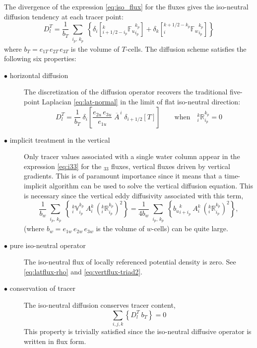 \documentclass[../main/NEMO_manual]{subfiles}
\begin{document}
The divergence of the expression \autoref{eq:iso_flux} for the fluxes gives the iso-neutral diffusion tendency at
each tracer point:
\[
  D_l^T = \frac{1}{b_T}
  \sum_{\substack{i_p,\,k_p}} \left\{ \delta_{i} \left[{_{i+1/2-i_p}^k
        {\mathbb{F}_u }_{i_p}^{k_p}} \right] + \delta_{k} \left[
      {_i^{k+1/2-k_p} {\mathbb{F}_w}_{i_p}^{k_p}} \right] \right\}
\]
where $b_T= e_{1T}\,e_{2T}\,e_{3T}$ is the volume of $T$-cells.
The diffusion scheme satisfies the following six properties:
\begin{description}
\item[$\bullet$ horizontal diffusion]
  The discretization of the diffusion operator recovers the traditional five-point Laplacian
  \autoref{eq:lat-normal} in the limit of flat iso-neutral direction:
  \[
    D_l^T = \frac{1}{b_T} \
    \delta_{i} \left[ \frac{e_{2u}\,e_{3u}}{e_{1u}} \;
      \overline{A}^{\,i} \; \delta_{i+1/2}[T] \right] \qquad
    \text{when} \quad { _i^k \mathbb{R}_{i_p}^{k_p} }=0
  \]

\item[$\bullet$ implicit treatment in the vertical]
  Only tracer values associated with a single water column appear in the expression \autoref{eq:i33} for
  the $_{33}$ fluxes, vertical fluxes driven by vertical gradients.
  This is of paramount importance since it means that a time-implicit algorithm can be used to
  solve the vertical diffusion equation.
  This is necessary since the vertical eddy diffusivity associated with this term,
  \[
    \frac{1}{b_w}\sum_{\substack{i_p, \,k_p}} \left\{
      {\:}_i^k\mathbb{V}_{i_p}^{k_p} \: {A}_i^k \: \left(_i^k \mathbb{R}_{i_p}^{k_p}\right)^2
    \right\}  =
    \frac{1}{4b_w}\sum_{\substack{i_p, \,k_p}} \left\{
      {b_u}_{i+i_p}^k\: {A}_i^k \: \left(_i^k \mathbb{R}_{i_p}^{k_p}\right)^2
    \right\},
  \]
  (where $b_w= e_{1w}\,e_{2w}\,e_{3w}$ is the volume of $w$-cells) can be quite large.

\item[$\bullet$ pure iso-neutral operator]
  The iso-neutral flux of locally referenced potential density is zero.
  See \autoref{eq:latflux-rho} and \autoref{eq:vertflux-triad2}.

\item[$\bullet$ conservation of tracer]
  The iso-neutral diffusion conserves tracer content, \ie
  \[
    \sum_{i,j,k} \left\{ D_l^T \      b_T \right\} = 0
  \]
  This property is trivially satisfied since the iso-neutral diffusive operator is written in flux form.


\end{description}
\end{document}
